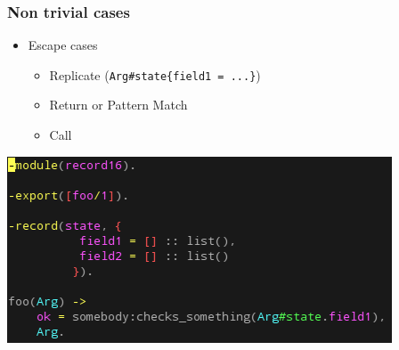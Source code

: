 \begin{frame}
\frametitle{Non trivial cases}

\begin{itemize}
	\item Escape cases
	\begin{itemize}
		\item Replicate (\texttt{Arg\#state\{field1 = ...\}})
		\item Return or Pattern Match
		\item Call
	\end{itemize}
\end{itemize}

\begin{center}
\includegraphics[scale=0.45]{../figures/test16}
\end{center}
\end{frame}

